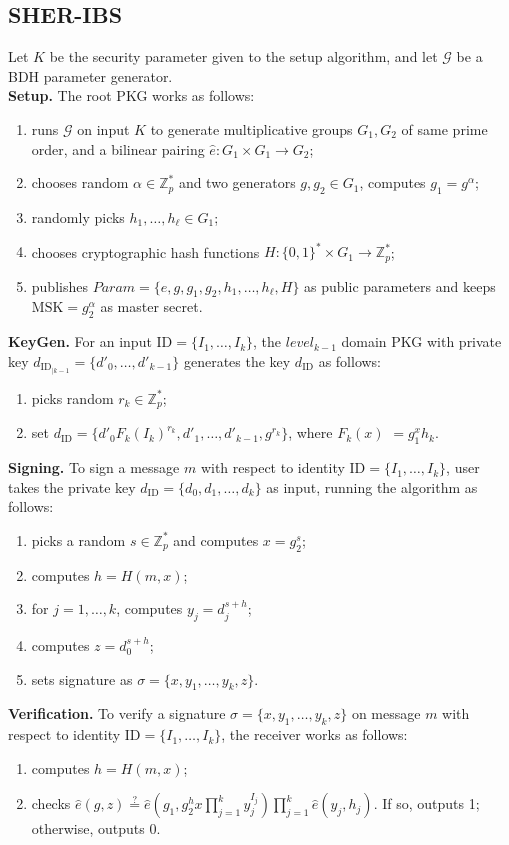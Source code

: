 \documentclass[letter]{ieice}
\begin{document}
\subsection{SHER-IBS } \label{sec-sher}
Let $K$ be the security parameter given to the setup algorithm, and let $\mathcal{G}$ be a BDH parameter generator.
\\
\textbf{Setup.} The root PKG works as follows:
\begin{enumerate}
\item runs $\mathcal{G}$ on input $K$ to generate multiplicative groups $G_1, G_2$ of same prime order, and a bilinear pairing $\hat{e}: G_1 \times G_1 \rightarrow G_2$;
\item chooses random $\alpha \in \mathbb{Z}^*_p$ and two generators $g, g_2 \in G_1$, computes $g_1 = g^\alpha$;
\item randomly picks $h_1, \ldots, h_\ell \in G_1$;
\item chooses cryptographic hash functions $H: \{0, 1\}^* \times G_1 \rightarrow \mathbb{Z}_p^*$;
\item publishes $Param = \{\hat{e}, g, g_1,  g_2, h_1, \ldots, h_\ell, H\}$ as public parameters and keeps $\mathrm{MSK} = g_2^\alpha$ as master secret.
\end{enumerate}
\textbf{KeyGen.} For an input $\mathrm{ID} = \{I_1, \ldots, I_k\}$, the $level_{k-1}$ domain PKG with private key $d_{\mathrm{ID}_{\mid k-1}} = \{d'_0, \ldots, d'_{k-1}\}$ generates the key $d_\mathrm{ID}$ as follows:
\begin{enumerate}
\item picks random $r_k \in \mathbb{Z}_p^*$;
\item set $d_{\mathrm{ID}} = \{d'_0F_k(I_k)^{r_k}, d'_1, \ldots, d'_{k-1}, g^{r_k}\}$, where $F_k(x)$ $ = g_1^xh_k$.
\end{enumerate}
\textbf{Signing.} To sign a message $m$ with respect to identity $\mathrm{ID} = \{I_1, \ldots, I_k\}$, user takes the private key $d_{\mathrm{ID}} = \{d_0, d_1, \ldots, d_k\}$ as input, running the algorithm as follows:
\begin{enumerate}
\item picks a random $s \in \mathbb{Z}_p^*$ and computes $x = g_2^s$;
\item computes  $h = H(m, x)$;
\item for $j = 1, \ldots, k$, computes $y_j = d_j^{s+h}$;
\item computes $z= d_0^{s + h}$;
\item sets signature as $\sigma = \{x, y_1, \ldots, y_k, z\}$.
\end{enumerate}
\textbf{Verification.} To verify a signature $\sigma = \{x, y_1, \ldots, y_k, z\}$ on message $m$ with respect to identity $\mathrm{ID} = \{I_1, \ldots, I_k\}$, the receiver works as follows:
\begin{enumerate}
\item computes $h = H(m, x)$;
\item checks $\hat{e}(g, z) \stackrel{?}{=} \hat{e}(g_1, g_2^hx\prod_{j=1}^k y_j^{I_j})\prod_{j=1}^k \hat{e}(y_j, h_j)$.
If so, outputs 1; otherwise, outputs 0.
\end{enumerate}
\end{document}
